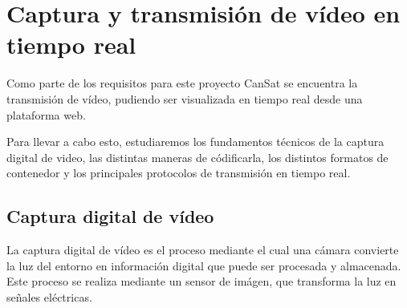 \section{Captura y transmisión de vídeo en tiempo real}
Como parte de los requisitos para este proyecto CanSat se encuentra la transmisión de vídeo, pudiendo ser visualizada en tiempo real desde una plataforma web.

Para llevar a cabo esto, estudiaremos los fundamentos técnicos de la captura digital de video, las distintas maneras de códificarla, los distintos formatos de contenedor y los principales protocolos de transmisión en tiempo real.

\subsection{Captura digital de vídeo}
La captura digital de vídeo es el proceso mediante el cual una cámara convierte la luz del entorno en información digital que puede ser procesada y almacenada.
Este proceso se realiza mediante un sensor de imágen, que transforma la luz en señales eléctricas.


